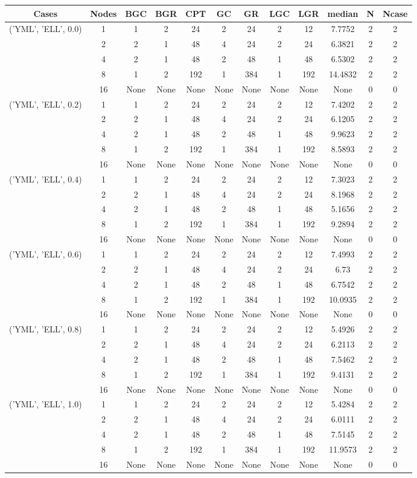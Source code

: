 \begin{tabular}{cccccccccccc}
\hline
Cases & Nodes& BGC& BGR& CPT& GC& GR& LGC& LGR& median & N & Ncase \\
\hline
\multirow{5}{*}{('YML', 'ELL', 0.0)}& 1& 1& 2& 24& 2& 24& 2& 12& 7.7752& 2& 2\\
& 2& 2& 1& 48& 4& 24& 2& 24& 6.3821& 2& 2\\
& 4& 2& 1& 48& 2& 48& 1& 48& 6.5302& 2& 2\\
& 8& 1& 2& 192& 1& 384& 1& 192& 14.4832& 2& 2\\
& 16& None& None& None& None& None& None& None& None& 0& 0\\
\hline
\multirow{5}{*}{('YML', 'ELL', 0.2)}& 1& 1& 2& 24& 2& 24& 2& 12& 7.4202& 2& 2\\
& 2& 2& 1& 48& 4& 24& 2& 24& 6.1205& 2& 2\\
& 4& 2& 1& 48& 2& 48& 1& 48& 9.9623& 2& 2\\
& 8& 1& 2& 192& 1& 384& 1& 192& 8.5893& 2& 2\\
& 16& None& None& None& None& None& None& None& None& 0& 0\\
\hline
\multirow{5}{*}{('YML', 'ELL', 0.4)}& 1& 1& 2& 24& 2& 24& 2& 12& 7.3023& 2& 2\\
& 2& 2& 1& 48& 4& 24& 2& 24& 8.1968& 2& 2\\
& 4& 2& 1& 48& 2& 48& 1& 48& 5.1656& 2& 2\\
& 8& 1& 2& 192& 1& 384& 1& 192& 9.2894& 2& 2\\
& 16& None& None& None& None& None& None& None& None& 0& 0\\
\hline
\multirow{5}{*}{('YML', 'ELL', 0.6)}& 1& 1& 2& 24& 2& 24& 2& 12& 7.4993& 2& 2\\
& 2& 2& 1& 48& 4& 24& 2& 24& 6.73& 2& 2\\
& 4& 2& 1& 48& 2& 48& 1& 48& 6.7542& 2& 2\\
& 8& 1& 2& 192& 1& 384& 1& 192& 10.0935& 2& 2\\
& 16& None& None& None& None& None& None& None& None& 0& 0\\
\hline
\multirow{5}{*}{('YML', 'ELL', 0.8)}& 1& 1& 2& 24& 2& 24& 2& 12& 5.4926& 2& 2\\
& 2& 2& 1& 48& 4& 24& 2& 24& 6.2113& 2& 2\\
& 4& 2& 1& 48& 2& 48& 1& 48& 7.5462& 2& 2\\
& 8& 1& 2& 192& 1& 384& 1& 192& 9.4131& 2& 2\\
& 16& None& None& None& None& None& None& None& None& 0& 0\\
\hline
\multirow{5}{*}{('YML', 'ELL', 1.0)}& 1& 1& 2& 24& 2& 24& 2& 12& 5.4284& 2& 2\\
& 2& 2& 1& 48& 4& 24& 2& 24& 6.0111& 2& 2\\
& 4& 2& 1& 48& 2& 48& 1& 48& 7.5145& 2& 2\\
& 8& 1& 2& 192& 1& 384& 1& 192& 11.9573& 2& 2\\
& 16& None& None& None& None& None& None& None& None& 0& 0\\
\hline
\end{tabular}


